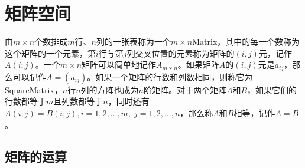 \section{矩阵空间}

\begin{definition}
	由$m\times n$个数排成$m$行、$n$列的一张表称为一个$m\times n$\gls{Matrix}，其中的每一个数称为这个矩阵的一个元素，第$i$行与第$j$列交叉位置的元素称为矩阵的$(i,j)$元，记作$A(i;j)$。一个$m\times n$矩阵可以简单地记作$A_{m\times n}$。如果矩阵$A$的$(i,j)$元是$a_{ij}$，那么可以记作$A=(a_{ij})$。如果一个矩阵的行数和列数相同，则称它为\gls{SquareMatrix}，$n$行$n$列的方阵也成为$n$阶矩阵。对于两个矩阵$A$和$B$，如果它们的行数都等于$m$且列数都等于$n$，同时还有$A(i;j)=B(i;j),i=1,2,\dots,m,\;j=1,2,\dots,n$，那么称$A$和$B$相等，记作$A=B$。
\end{definition}

\subsection{矩阵的运算}
